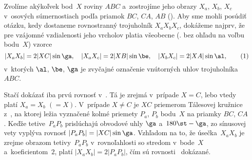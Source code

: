 {%
Zvolíme akýkoľvek bod~$X$ roviny $ABC$
a~zostrojíme jeho obrazy $X_a$, $X_b$, $X_c$ v~osových súmernostiach
podľa priamok $BC$, $CA$, $AB$ (\obr). Aby sme mohli
posúdiť otázku, kedy dostaneme rovnostranný trojuholník $X_aX_bX_c$,
dokážeme najprv, že pre vzájomné vzdialenosti jeho vrcholov platia
všeobecne (\tj. bez ohľadu na voľbu bodu~$X$) vzorce
$$
|X_aX_b|=2|XC|\sin\ga,\quad
|X_aX_c|=2|XB|\sin\be,\quad
|X_bX_c|=2|XA|\sin\al,
\tag1$$
v~ktorých $\al$, $\be$, $\ga$ je zvyčajné označenie
vnútorných uhlov trojuholníka $ABC$.
%

Stačí dokázať iba prvú rovnosť v~. Tá je zrejmá
v~prípade $X=C$, lebo vtedy platí  $X_a=X_b$ $(=X)$. V~prípade $X\ne C$
je $XC$ priemerom Tálesovej kružnice z~, na ktorej ležia
vyznačené kolmé priemety $P_a$, $P_b$ bodu~$X$ na priamky $BC$, $CA$.
Keďže tetive~$P_aP_b$ prislúchajú obvodové uhly $\ga$
a~$180\st-\ga$, zo sínusovej vety vyplýva rovnosť $|P_aP_b|=|XC|\sin\ga$.
Vzhľadom na to, že úsečka~$X_aX_b$ je zrejme obrazom
tetivy~$P_aP_b$ v~rovnoľahlosti so stredom v~bode~$X$
a~koeficientom~$2$, platí $|X_aX_b|=2|P_aP_b|$, čím sú
rovnosti~ dokázané.

}
